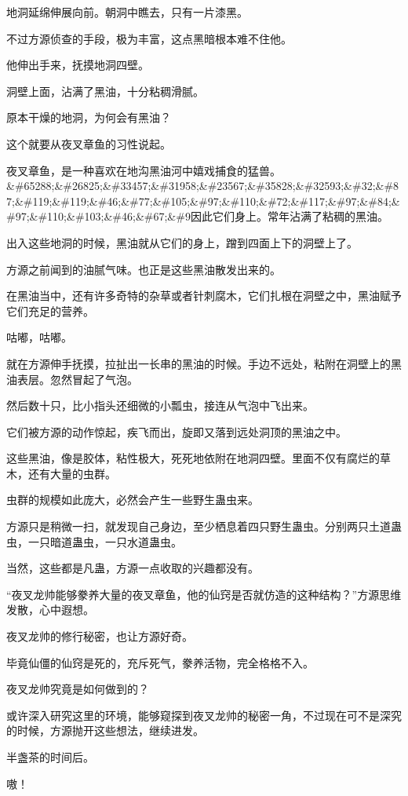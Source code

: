 \begin{this_body}
地洞延绵伸展向前。朝洞中瞧去，只有一片漆黑。

不过方源侦查的手段，极为丰富，这点黑暗根本难不住他。

他伸出手来，抚摸地洞四壁。

洞壁上面，沾满了黑油，十分粘稠滑腻。

原本干燥的地洞，为何会有黑油？

这个就要从夜叉章鱼的习性说起。

夜叉章鱼，是一种喜欢在地沟黑油河中嬉戏捕食的猛兽。\&\#65288;\&\#26825;\&\#33457;\&\#31958;\&\#23567;\&\#35828;\&\#32593;\&\#32;\&\#87;\&\#119;\&\#119;\&\#46;\&\#77;\&\#105;\&\#97;\&\#110;\&\#72;\&\#117;\&\#97;\&\#84;\&\#97;\&\#110;\&\#103;\&\#46;\&\#67;\&\#9因此它们身上。常年沾满了粘稠的黑油。

出入这些地洞的时候，黑油就从它们的身上，蹭到四面上下的洞壁上了。

方源之前闻到的油腻气味。也正是这些黑油散发出来的。

在黑油当中，还有许多奇特的杂草或者针刺腐木，它们扎根在洞壁之中，黑油赋予它们充足的营养。

咕嘟，咕嘟。

就在方源伸手抚摸，拉扯出一长串的黑油的时候。手边不远处，粘附在洞壁上的黑油表层。忽然冒起了气泡。

然后数十只，比小指头还细微的小瓢虫，接连从气泡中飞出来。

它们被方源的动作惊起，疾飞而出，旋即又落到远处洞顶的黑油之中。

这些黑油，像是胶体，粘性极大，死死地依附在地洞四壁。里面不仅有腐烂的草木，还有大量的虫群。

虫群的规模如此庞大，必然会产生一些野生蛊虫来。

方源只是稍微一扫，就发现自己身边，至少栖息着四只野生蛊虫。分别两只土道蛊虫，一只暗道蛊虫，一只水道蛊虫。

当然，这些都是凡蛊，方源一点收取的兴趣都没有。

“夜叉龙帅能够豢养大量的夜叉章鱼，他的仙窍是否就仿造的这种结构？”方源思维发散，心中遐想。

夜叉龙帅的修行秘密，也让方源好奇。

毕竟仙僵的仙窍是死的，充斥死气，豢养活物，完全格格不入。

夜叉龙帅究竟是如何做到的？

或许深入研究这里的环境，能够窥探到夜叉龙帅的秘密一角，不过现在可不是深究的时候，方源抛开这些想法，继续进发。

半盏茶的时间后。

嗷！


\end{this_body}

